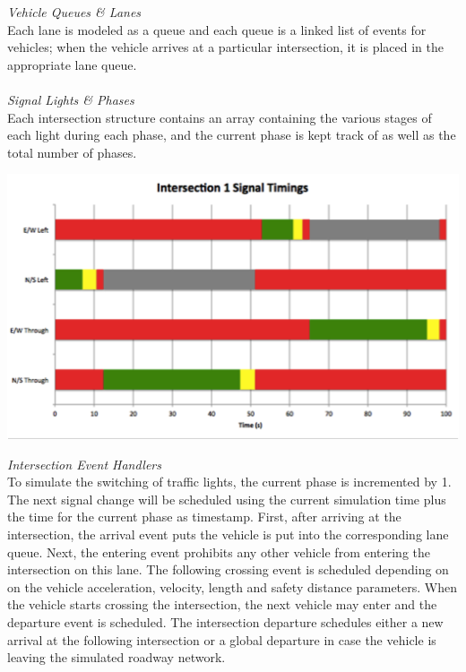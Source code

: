 \documentclass[landscape,a0paper,fontscale=0.285]{baposter}
\begin{document}
\begin{poster}
{\textit{Vehicle Queues \& Lanes}\\
Each lane is modeled as a queue and each queue is a linked list of events for vehicles; when the vehicle arrives at a particular intersection, it is placed in the appropriate lane queue. \\\\
\textit{Signal Lights \& Phases}\\

Each intersection structure contains an array containing the various stages of each light during each phase, and the current phase is kept track of as well as the total number of phases.
\begin{center}
\includegraphics[width=.35\linewidth]{i1}

\end{center}

\textit{Intersection Event Handlers}\\
To simulate the switching of traffic lights, the current phase is incremented by 1. The next signal change will be scheduled using the current simulation time plus the time for the current phase as timestamp. First, after arriving at the intersection, the arrival event puts the vehicle is put into the corresponding lane queue. Next, the entering event prohibits any other vehicle from entering the intersection on this lane. The following crossing event is scheduled depending on on the vehicle acceleration, velocity, length and safety distance parameters. When the vehicle starts crossing the intersection, the next vehicle may enter and the departure event is scheduled. The intersection departure schedules either a new arrival at the following intersection or a global departure in case the vehicle is leaving the simulated roadway network.




}


\end{poster}
\end{document}
